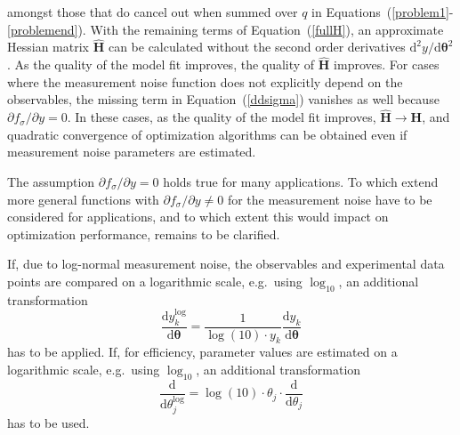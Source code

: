 \documentclass[12pt,a4paper]{scrartcl}
\newcommand{\DD}[2]{\frac{\mathrm{d} #1}{\mathrm{d} #2}}
\begin{document}
amongst those that do cancel out when summed over $q$ in Equations~(\ref{problem1}-
\ref{problemend}). With the remaining terms of Equation~(\ref{fullH}), an approximate 
Hessian matrix $\mathbf{\hat H}$ can be calculated without the second order derivatives 
$\mathrm{d}^2 {y}/\mathrm{d} \boldsymbol{\theta}^2$. As the quality of the model fit improves, the quality of 
$\mathbf{\hat H}$ improves. For cases where the measurement noise 
function does not explicitly depend on the observables, the missing term in 
Equation~(\ref{ddsigma}) vanishes as well because $\partial f_\sigma / \partial y= 0$. In these cases, 
as the quality of the model fit improves, $\mathbf{\hat H} \rightarrow 
\mathbf{H}$, and quadratic convergence of optimization algorithms can be obtained even if measurement noise parameters are estimated. 

The assumption $\partial f_\sigma / \partial y = 0$ holds true for many applications. To 
which extend more general functions with $\partial f_\sigma / \partial y \not= 0$ for the 
measurement noise have to be considered for applications, and to which extent this 
would impact on optimization performance, remains to be clarified.

If, due to log-normal measurement noise, the observables and experimental data points 
are compared on a logarithmic scale, e.g.~using $\log_{10}$, an additional transformation
\begin{equation}
	\DD{y_k^{\log}}{\boldsymbol{\theta}} =  \frac{1}{\log(10) \cdot y_k}\DD{y_k}
{\boldsymbol{\theta}}
\end{equation}
has to be applied. 
If, for efficiency, parameter values are estimated on a logarithmic scale, e.g.~using $\log_{10}$, 
an additional transformation
\begin{equation}
	\DD{}{\theta_j^{\log}} = \log(10)\cdot \theta_j \cdot \DD{}{\theta_j}
\end{equation}
has to be used. 
\end{document}
